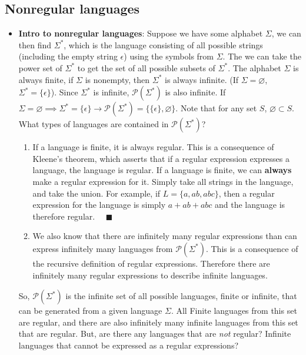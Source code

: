 \documentclass{report}
\begin{document}
    \pagebreak 
    \subsection{Nonregular languages}
    \begin{itemize}
    \item \textbf{Intro to nonregular languages}: Suppose we have some alphabet $\Sigma$, we can then find $\Sigma^{*}$, which is the language consisting of all possible strings (including the empty string $\epsilon$) using the symbols from $\Sigma$. The we can take the power set of $\Sigma^{*}$ to get the set of all possible subsets of $\Sigma^{*}$. The alphabet $\Sigma$ is always finite, if $\Sigma$ is nonempty, then $\Sigma^{*}$ is always infinite. (If $\Sigma = \varnothing$, $\Sigma^{*} = \{\epsilon\} $). Since $\Sigma^{*}$ is infinite, $\mathcal{P}(\Sigma^{*})$ is also infinite. If $\Sigma = \varnothing \implies \Sigma^{*} = \{\epsilon\} \rightarrow \mathcal{P}(\Sigma^{*}) = \{\{\epsilon\}, \varnothing\}$. Note that for any set $S$, $\varnothing \subset S$.
        \bigbreak \noindent 
        What types of languages are contained in $\mathcal{P}(\Sigma^{*})$? 
        \begin{enumerate}
            \item If a language is finite, it is always regular. This is a consequence of Kleene's theorem, which asserts that if a regular expression expresses a language, the language is regular. If a language is finite, we can \textbf{always} make a regular expression for it. Simply take all strings in the language, and take the union. For example, if $L = \{a,ab,abc\}$, then a regular expression for the language is simply $a + ab + abc$ and the language is therefore regular. $\quad \blacksquare$ 
            \item We also know that there are infinitely many regular expressions than can express infinitely many languages from $\mathcal{P}(\Sigma^{*})$. This is a consequence of the recursive definition of regular expressions. Therefore there are infinitely many regular expressions to describe infinite languages.
        \end{enumerate}
        So, $\mathcal{P}(\Sigma^{*})$ is the infinite set of all possible languages, finite or infinite, that can be generated from a given language $\Sigma$. All Finite languages from this set are regular, and there are also infinitely many infinite languages from this set that are regular. But, are there any languages that are \textit{not} regular? Infinite languages that cannot be expressed as a regular expressions? 

\end{itemize}
\end{document}
